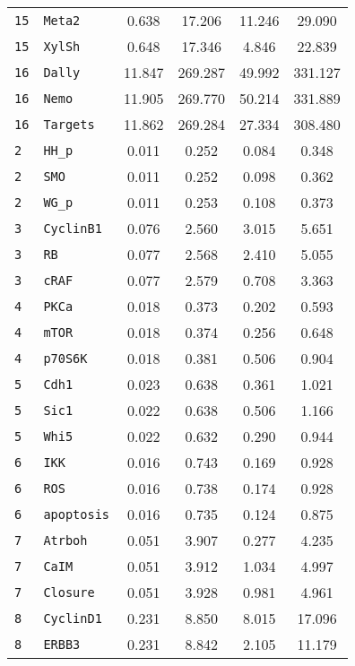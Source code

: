 \begin{longtable}{llcccc}
\texttt{15} & \texttt{Meta2} & 0.638 & 17.206 & 11.246 & 29.090 \\
\texttt{15} & \texttt{XylSh} & 0.648 & 17.346 & 4.846 & 22.839 \\
\texttt{16} & \texttt{Dally} & 11.847 & 269.287 & 49.992 & 331.127 \\
\texttt{16} & \texttt{Nemo} & 11.905 & 269.770 & 50.214 & 331.889 \\
\texttt{16} & \texttt{Targets} & 11.862 & 269.284 & 27.334 & 308.480 \\
\texttt{2} & \texttt{HH\_p} & 0.011 & 0.252 & 0.084 & 0.348 \\
\texttt{2} & \texttt{SMO} & 0.011 & 0.252 & 0.098 & 0.362 \\
\texttt{2} & \texttt{WG\_p} & 0.011 & 0.253 & 0.108 & 0.373 \\
\texttt{3} & \texttt{CyclinB1} & 0.076 & 2.560 & 3.015 & 5.651 \\
\texttt{3} & \texttt{RB} & 0.077 & 2.568 & 2.410 & 5.055 \\
\texttt{3} & \texttt{cRAF} & 0.077 & 2.579 & 0.708 & 3.363 \\
\texttt{4} & \texttt{PKCa} & 0.018 & 0.373 & 0.202 & 0.593 \\
\texttt{4} & \texttt{mTOR} & 0.018 & 0.374 & 0.256 & 0.648 \\
\texttt{4} & \texttt{p70S6K} & 0.018 & 0.381 & 0.506 & 0.904 \\
\texttt{5} & \texttt{Cdh1} & 0.023 & 0.638 & 0.361 & 1.021 \\
\texttt{5} & \texttt{Sic1} & 0.022 & 0.638 & 0.506 & 1.166 \\
\texttt{5} & \texttt{Whi5} & 0.022 & 0.632 & 0.290 & 0.944 \\
\texttt{6} & \texttt{IKK} & 0.016 & 0.743 & 0.169 & 0.928 \\
\texttt{6} & \texttt{ROS} & 0.016 & 0.738 & 0.174 & 0.928 \\
\texttt{6} & \texttt{apoptosis} & 0.016 & 0.735 & 0.124 & 0.875 \\
\texttt{7} & \texttt{Atrboh} & 0.051 & 3.907 & 0.277 & 4.235 \\
\texttt{7} & \texttt{CaIM} & 0.051 & 3.912 & 1.034 & 4.997 \\
\texttt{7} & \texttt{Closure} & 0.051 & 3.928 & 0.981 & 4.961 \\
\texttt{8} & \texttt{CyclinD1} & 0.231 & 8.850 & 8.015 & 17.096 \\
\texttt{8} & \texttt{ERBB3} & 0.231 & 8.842 & 2.105 & 11.179 \\

\end{longtable}
